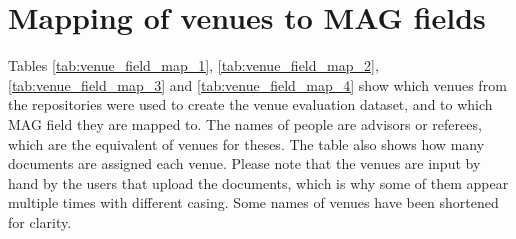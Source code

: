 \section{Mapping of venues to MAG fields} \label{appendix_venue_map}

Tables \ref{tab:venue_field_map_1}, \ref{tab:venue_field_map_2}, \ref{tab:venue_field_map_3} and \ref{tab:venue_field_map_4} show which venues from the repositories were used to create the venue evaluation dataset, and to which MAG field they are mapped to. The names of people are advisors or referees, which are the equivalent of venues for theses. The table also shows how many documents are assigned each venue. Please note that the venues are input by hand by the users that upload the documents, which is why some of them appear multiple times with different casing. Some names of venues have been shortened for clarity.

